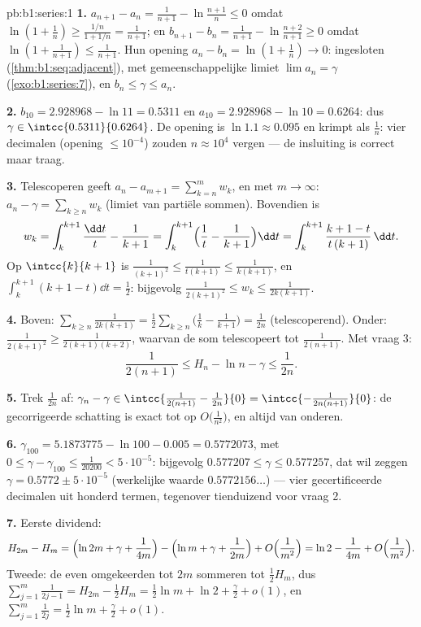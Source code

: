 \begin{solution}{pb:b1:series:1}
\textbf{1.} $a_{n+1} - a_n = \frac{1}{n+1} - \ln\frac{n+1}{n}
\leq 0$ omdat $\ln(1 + \frac1n) \geq \frac{1/n}{1 + 1/n} =
\frac{1}{n+1}$; en $b_{n+1} - b_n = \frac{1}{n+1} -
\ln\frac{n+2}{n+1} \geq 0$ omdat $\ln(1 + \frac{1}{n+1}) \leq
\frac{1}{n+1}$. Hun opening $a_n - b_n = \ln(1 + \frac1n) \to 0$:
ingesloten (\cref{thm:b1:seq:adjacent}), met gemeenschappelijke
limiet $\lim a_n = \gamma$ (\cref{exo:b1:series:7}), en $b_n \leq
\gamma \leq a_n$.

\textbf{2.} $b_{10} = 2.928968 - \ln 11 = 0.5311$ en $a_{10} =
2.928968 - \ln 10 = 0.6264$: dus $\gamma \in
\intcc{0.5311}{0.6264}$. De opening is $\ln 1.1 \approx 0.095$ en
krimpt als $\frac1n$: vier decimalen (opening $\leq 10^{-4}$)
zouden $n \approx 10^4$ vergen --- de insluiting is correct maar
traag.

\textbf{3.} Telescoperen geeft $a_n - a_{m+1} = \sum_{k=n}^{m}
w_k$, en met $m \to \infty$: $a_n - \gamma = \sum_{k\geq n} w_k$
(limiet van partiële sommen). Bovendien is
\[
w_k = \int_k^{k+1} \frac{\dd t}{t} - \frac{1}{k+1}
= \int_k^{k+1} \Bigl(\frac1t - \frac{1}{k+1}\Bigr)\dd t
= \int_k^{k+1} \frac{k + 1 - t}{t\,(k+1)}\,\dd t .
\]
Op $\intcc{k}{k+1}$ is $\frac{1}{(k+1)^2} \leq \frac{1}{t(k+1)}
\leq \frac{1}{k(k+1)}$, en $\int_k^{k+1}(k + 1 - t)\dd t =
\frac12$: bijgevolg $\frac{1}{2(k+1)^2} \leq w_k \leq
\frac{1}{2k(k+1)}$.

\textbf{4.} Boven: $\sum_{k \geq n} \frac{1}{2k(k+1)} =
\frac12\sum_{k\geq n}\bigl(\frac1k - \frac{1}{k+1}\bigr) =
\frac{1}{2n}$ (telescoperend). Onder: $\frac{1}{2(k+1)^2} \geq
\frac{1}{2(k+1)(k+2)}$, waarvan de som telescopeert tot
$\frac{1}{2(n+1)}$. Met vraag 3:
\[
\frac{1}{2(n+1)} \leq H_n - \ln n - \gamma \leq \frac{1}{2n} .
\]

\textbf{5.} Trek $\frac{1}{2n}$ af: $\gamma_n - \gamma \in
\intcc{\frac{1}{2(n+1)} - \frac{1}{2n}}{0} =
\intcc{-\frac{1}{2n(n+1)}}{0}$: de gecorrigeerde schatting is
exact tot op $O\bigl(\frac{1}{n^2}\bigr)$, en altijd van
onderen.

\textbf{6.} $\gamma_{100} = 5.1873775 - \ln 100 - 0.005 =
0.5772073$, met $0 \leq \gamma - \gamma_{100} \leq
\frac{1}{20200} < 5\cdot10^{-5}$: bijgevolg $0.577207 \leq \gamma
\leq 0.577257$, dat wil zeggen $\gamma = 0.5772 \pm 5\cdot10^{-5}$
(werkelijke waarde $0.5772156\dots$) --- vier gecertificeerde
decimalen uit honderd termen, tegenover tienduizend voor vraag 2.

\textbf{7.} Eerste dividend:
\[
H_{2m} - H_m = \Bigl(\ln 2m + \gamma + \frac{1}{4m}\Bigr)
- \Bigl(\ln m + \gamma + \frac{1}{2m}\Bigr) +
O\Bigl(\frac{1}{m^2}\Bigr)
= \ln 2 - \frac{1}{4m} + O\Bigl(\frac{1}{m^2}\Bigr).
\]
Tweede: de even omgekeerden tot $2m$ sommeren tot $\frac12 H_m$,
dus $\sum_{j=1}^{m}\frac{1}{2j-1} = H_{2m} - \frac12 H_m =
\frac12 \ln m + \ln 2 + \frac\gamma2 + o(1)$, en $\sum_{j=1}^m
\frac{1}{2j} = \frac12\ln m + \frac\gamma2 + o(1)$.


\end{solution}
